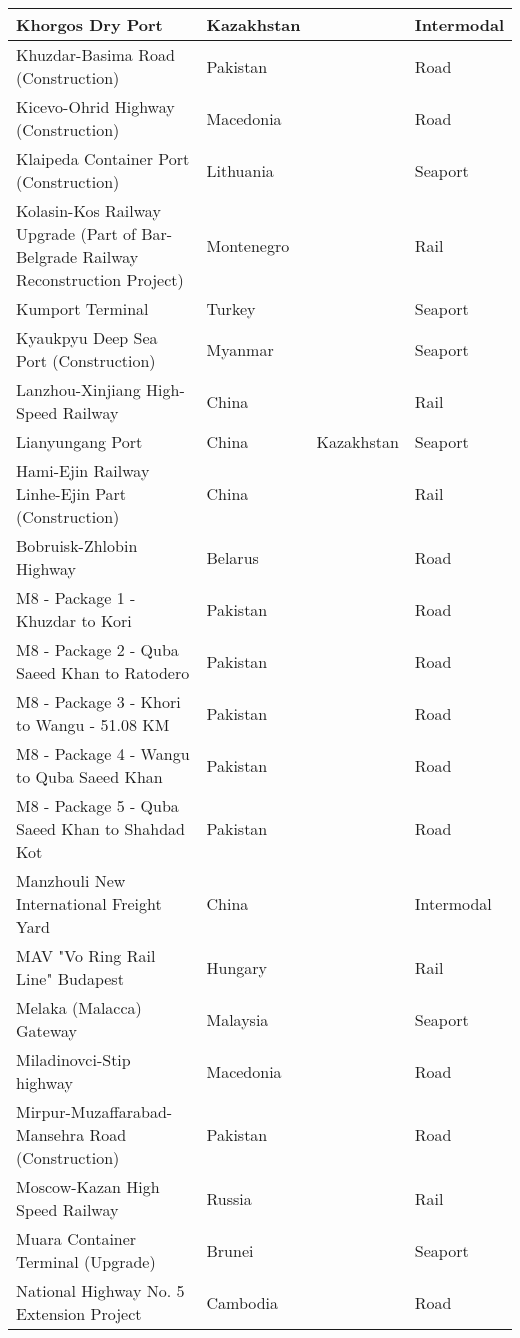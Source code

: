 \documentclass{article}
\begin{document}
\begin{center}
\begin{landscape}
\begin{longtable}{p{10cm}p{5cm}p{2cm}p{2cm}}
Khorgos Dry Port	&	Kazakhstan	&		&	Intermodal	\\	\hline
Khuzdar-Basima Road (Construction)	&	Pakistan	&		&	Road	\\	\hline
Kicevo-Ohrid Highway (Construction)	&	Macedonia	&		&	Road	\\	\hline
Klaipeda Container Port (Construction)	&	Lithuania	&		&	Seaport	\\	\hline
Kolasin-Kos Railway Upgrade (Part of Bar-Belgrade Railway Reconstruction Project)	&	Montenegro	&		&	Rail	\\	\hline
Kumport Terminal	&	Turkey	&		&	Seaport	\\	\hline
Kyaukpyu Deep Sea Port (Construction)	&	Myanmar	&		&	Seaport	\\	\hline
Lanzhou-Xinjiang High-Speed Railway	&	China	&		&	Rail	\\	\hline
Lianyungang Port	&	China	&	Kazakhstan	&	Seaport	\\	\hline
Hami-Ejin Railway Linhe-Ejin Part (Construction)	&	China	&		&	Rail	\\	\hline
Bobruisk-Zhlobin Highway	&	Belarus	&		&	Road	\\	\hline
M8 - Package 1 - Khuzdar to Kori	&	Pakistan	&		&	Road	\\	\hline
M8 - Package 2 - Quba Saeed Khan to Ratodero	&	Pakistan	&		&	Road	\\	\hline
M8 - Package 3 - Khori to Wangu - 51.08 KM	&	Pakistan	&		&	Road	\\	\hline
M8 - Package 4 - Wangu to Quba Saeed Khan	&	Pakistan	&		&	Road	\\	\hline
M8 - Package 5 - Quba Saeed Khan to Shahdad Kot	&	Pakistan	&		&	Road	\\	\hline
Manzhouli New International Freight Yard	&	China	&		&	Intermodal	\\	\hline
MAV "Vo Ring Rail Line" Budapest	&	Hungary	&		&	Rail	\\	\hline
Melaka (Malacca) Gateway	&	Malaysia	&		&	Seaport	\\	\hline
Miladinovci-Stip highway	&	Macedonia	&		&	Road	\\	\hline
Mirpur-Muzaffarabad-Mansehra Road (Construction)	&	Pakistan	&		&	Road	\\	\hline
Moscow-Kazan High Speed Railway	&	Russia	&		&	Rail	\\	\hline
Muara Container Terminal (Upgrade)	&	Brunei	&		&	Seaport	\\	\hline
National Highway No. 5 Extension Project	&	Cambodia	&		&	Road	\\	\hline

\end{longtable}
\end{landscape}
\end{center}
\end{document}
